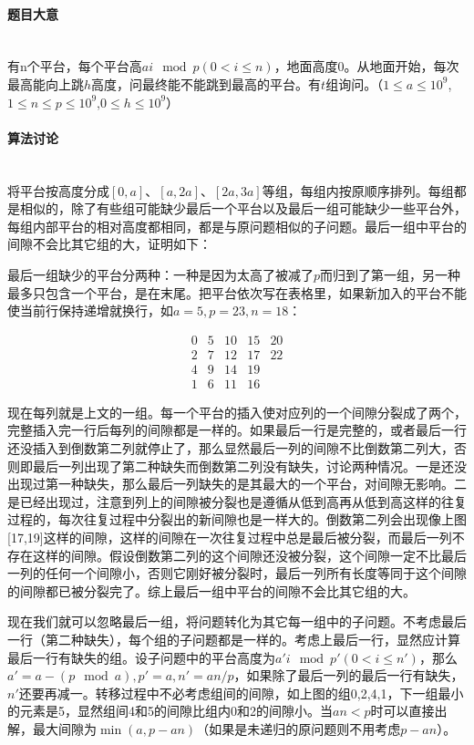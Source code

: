 \documentclass[UTF8]{ctexart}
\newcommand{\myparagraph}[1]{\paragraph{#1}\mbox{}\\}
\theoremstyle{nonumberplain}
\begin{document}
		\myparagraph{题目大意}
		
			有n个平台，每个平台高$ai \mod p (0<i \leq n)$，地面高度0。从地面开始，每次最高能向上跳$h$高度，问最终能不能跳到最高的平台。有$t$组询问。（$1 \leq a \leq 10^9$,$1 \leq n \leq p \leq 10^9$,$0 \leq h \leq 10^9$）
		
		\myparagraph{算法讨论}
		
			将平台按高度分成$[0,a]$、$[a,2a]$、$[2a,3a]$等组，每组内按原顺序排列。每组都是相似的，除了有些组可能缺少最后一个平台以及最后一组可能缺少一些平台外，每组内部平台的相对高度都相同，都是与原问题相似的子问题。最后一组中平台的间隙不会比其它组的大，证明如下：
			
			最后一组缺少的平台分两种：一种是因为太高了被减了$p$而归到了第一组，另一种最多只包含一个平台，是在末尾。把平台依次写在表格里，如果新加入的平台不能使当前行保持递增就换行，如$a=5,p=23,n=18$：
			
			$$\begin{array}{ccccc}
				0 & 5 & 10 & 15 & 20 \\
				2 & 7 & 12 & 17 & 22 \\
				4 & 9 & 14 & 19 & \\
				1 & 6 & 11 & 16 &
			\end{array}$$
			
			现在每列就是上文的一组。每一个平台的插入使对应列的一个间隙分裂成了两个，完整插入完一行后每列的间隙都是一样的。如果最后一行是完整的，或者最后一行还没插入到倒数第二列就停止了，那么显然最后一列的间隙不比倒数第二列大，否则即最后一列出现了第二种缺失而倒数第二列没有缺失，讨论两种情况。一是还没出现过第一种缺失，那么最后一列缺失的是其最大的一个平台，对间隙无影响。二是已经出现过，注意到列上的间隙被分裂也是遵循从低到高再从低到高这样的往复过程的，每次往复过程中分裂出的新间隙也是一样大的。倒数第二列会出现像上图[17,19]这样的间隙，这样的间隙在一次往复过程中总是最后被分裂，而最后一列不存在这样的间隙。假设倒数第二列的这个间隙还没被分裂，这个间隙一定不比最后一列的任何一个间隙小，否则它刚好被分裂时，最后一列所有长度等同于这个间隙的间隙都已被分裂完了。综上最后一组中平台的间隙不会比其它组的大。
			
			现在我们就可以忽略最后一组，将问题转化为其它每一组中的子问题。不考虑最后一行（第二种缺失），每个组的子问题都是一样的。考虑上最后一行，显然应计算最后一行有缺失的组。设子问题中的平台高度为$a'i \mod p' (0<i \leq n')$，那么$a'=a-(p \mod a), p'=a, n'=an/p$，如果除了最后一列的最后一行有缺失，$n'$还要再减一。转移过程中不必考虑组间的间隙，如上图的组0,2,4,1，下一组最小的元素是5，显然组间4和5的间隙比组内0和2的间隙小。当$an<p$时可以直接出解，最大间隙为$\min(a,p-an)$（如果是未递归的原问题则不用考虑$p-an$）。
		
\end{document}
